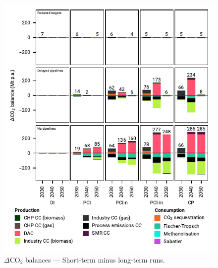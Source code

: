 \documentclass[pdflatex,sn-nature]{sn-jnl}
\theoremstyle{thmstyleone}%
\theoremstyle{thmstyletwo}%
\theoremstyle{thmstylethree}%
\begin{document}
\begin{appendices}
\begin{figure}[htbp]
  \centering
  \includegraphics{figures/balances_overview_extended_co2_stored}
  \caption{$\Delta$CO$_2$ balances --- Short-term minus long-term runs.}
  \label{fig:balances_overview_extended_co2_stored}
\end{figure}


\end{appendices}
\end{document}
